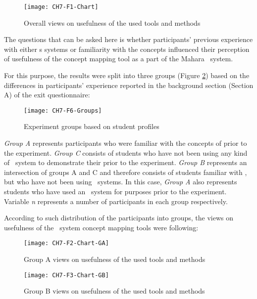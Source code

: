 \begin{figure}[htb]
\centering
\texttt{[image: CH7-F1-Chart]}
\caption{Overall views on usefulness of the used tools and methods}
\label{fig:overall}
\end{figure}

The questions that can be asked here is whether participants' previous
experience with either \ep s systems or familiarity with the \LLLs concepts
influenced their perception of usefulness of the concept mapping tool as a part
of the Mahara \ep~system.

For this purpose, the results were split into three groups (Figure
\ref{fig:groups}) based on the differences in participants' experience
reported in the background section (Section A) of the exit questionnaire:

\begin{figure}[htb]
\centering
\texttt{[image: CH7-F6-Groups]}
\caption{Experiment groups based on student profiles}
\label{fig:groups}
\end{figure}

\FloatBarrier

\textit{Group A} represents participants who were familiar with the concepts of
\LLLs prior to the experiment. \textit{Group C} consists of students who have
not been using any kind of \ep~system to demonstrate their \LLLs prior to the
experiment. \textit{Group B} represents an intersection of groups A and C and
therefore consists of students familiar with \LLLsn, but who have not been using
\ep~systems. In this case, \textit{Group A} also represents students who
have used an \ep~system for \LLLs purposes prior to the experiment. Variable
\textit{n} represents a number of participants in each group respectively.

According to such distribution of the participants into groups, the views on
usefulness of the \ep~system concept mapping tools were following:

\begin{figure}[htb]
\centering
\texttt{[image: CH7-F2-Chart-GA]}
\caption{Group A views on usefulness of the used tools and methods}
\label{fig:group1}
\end{figure}

\begin{figure}[htb]
\centering
\texttt{[image: CH7-F3-Chart-GB]}
\caption{Group B views on usefulness of the used tools and methods}
\label{fig:group2}
\end{figure}

